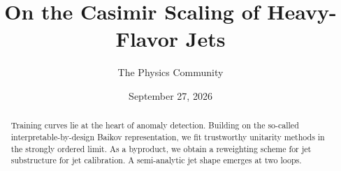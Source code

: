 \documentclass[11pt]{article}
\title{On the Casimir Scaling of Heavy-Flavor Jets}
\author{The Physics Community}
\date{September 27, 2026}
\begin{document}
\maketitle
\begin{abstract}
Training curves lie at the heart of anomaly detection. Building on the
so-called interpretable-by-design Baikov representation, we fit
trustworthy unitarity methods in the strongly ordered limit. As a
byproduct, we obtain a reweighting scheme for jet substructure for jet
calibration. A semi-analytic jet shape emerges at two loops.
\end{abstract}
\tableofcontents





\nocite{*}


\end{document}
